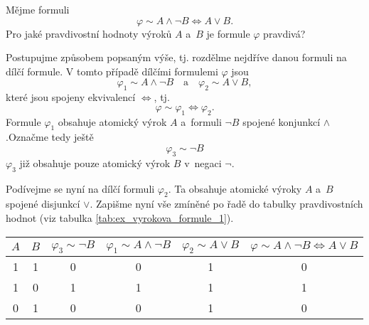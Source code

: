 \begin{example}\label{ex:vyrokova_formule_1}
    Mějme formuli
    \begin{equation*}
        \varphi\sim A \land \neg B \iff A \lor B.
    \end{equation*}
    Pro jaké pravdivostní hodnoty výroků $A$ a~$B$ je formule $\varphi$ pravdivá?
    \begin{solution}
        Postupujme způsobem popsaným výše, tj. rozdělme nejdříve danou formuli na dílčí formule. V tomto případě dílčími formulemi $\varphi$ jsou
        \begin{equation*}
            \varphi_1\sim A \land \neg B \quad \text{a} \quad \varphi_2\sim A \lor B,
        \end{equation*}
        které jsou spojeny ekvivalencí $\iff$, tj.
        \begin{equation*}
            \varphi\sim \varphi_1 \iff \varphi_2.
        \end{equation*}
        Formule $\varphi_1$ obsahuje atomický výrok $A$ a~formuli $\neg B$ spojené konjunkcí $\land$.\linebreak Označme tedy ještě
        \begin{equation*}
            \varphi_3\sim \neg B
        \end{equation*}
        $\varphi_3$ již obsahuje pouze atomický výrok $B$ v~negaci $\neg$.\par
        Podívejme se nyní na dílčí formuli $\varphi_2$. Ta obsahuje atomické výroky $A$ a~$B$ spojené disjunkcí $\lor$. Zapišme nyní vše zmíněné po řadě do tabulky pravdivostních hodnot (viz tabulka \ref{tab:ex_vyrokova_formule_1}).\par
        \begin{table}[H]
            \centering
            \begin{tabular}{|cc|cccc|}
            \hline
            $A$ & $B$ & $\varphi_3\sim \neg B$ & $\varphi_1\sim A \land \neg B$ & $\varphi_2\sim A \lor B$ & $\varphi\sim A \land \neg B \iff A \lor B$ \\ \hline
            1   & 1   & 0               & 0                          & 1                    & 0                                          \\
            1   & 0   & 1               & 1                          & 1                    & 1                                          \\
            0   & 1   & 0               & 0                          & 1                    & 0                                          \\

\end{tabular}
\end{table}
\end{solution}
\end{example}
